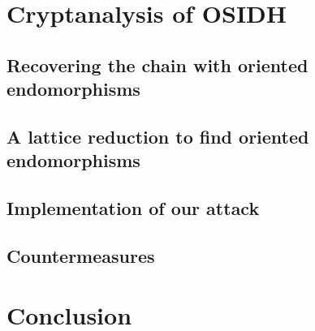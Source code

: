 \documentclass[10pt]{beamer}
\theoremstyle{plain}
\theoremstyle{definition}
\renewcommand{\(}{\left(}
\renewcommand{\)}{\right)}
\begin{document}
\section{Cryptanalysis of OSIDH}

\subsection{Recovering the chain with oriented endomorphisms}

\subsection{A lattice reduction to find oriented endomorphisms}

\subsection{Implementation of our attack}

\subsection{Countermeasures}

\section{Conclusion}
\end{document}
